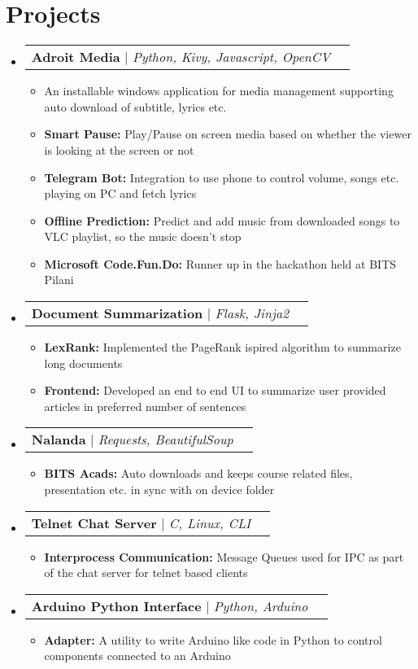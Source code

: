 \documentclass[letterpaper,11pt]{article}
\makeatletter
\newcommand{\resumeItem}[1]{
  \item\small{
    {#1 \vspace{-2pt}}
  }
}
\newcommand{\resumeProjectHeading}[2]{
    \item
    \begin{tabular*}{0.97\textwidth}{l@{\extracolsep{\fill}}r}
      \small#1 & #2 \\
    \end{tabular*}\vspace{-7pt}
}
\newcommand{\resumeSubHeadingListStart}{\begin{itemize}[leftmargin=0.15in, label={}]}
\newcommand{\resumeSubHeadingListEnd}{\end{itemize}}
\newcommand{\resumeItemListStart}{\begin{itemize}}
\newcommand{\resumeItemListEnd}{\end{itemize}\vspace{-5pt}}
\makeatother
\begin{document}
\section{Projects}
    \resumeSubHeadingListStart
      \resumeProjectHeading
          {\textbf{Adroit Media} $|$ \emph{Python, Kivy, Javascript, OpenCV}}{\href{https://adroitweb.github.io/}{\faGlobe} \href{https://github.com/triptu/AdroitMedia}{\faGithub}}
          \resumeItemListStart
            \resumeItem{An installable windows application for media management supporting auto download of subtitle, lyrics etc.}
            \resumeItem{\textbf{Smart Pause:} Play/Pause on screen media based on whether the viewer is looking at the screen or not}
            \resumeItem{\textbf{Telegram Bot:} Integration to use phone to control volume, songs etc. playing on PC and fetch lyrics}
            \resumeItem{\textbf{Offline Prediction:} Predict and add music from downloaded songs to VLC playlist, so the music doesn't stop}
            \resumeItem{\textbf{Microsoft Code.Fun.Do:} Runner up in the hackathon held at BITS Pilani}
          \resumeItemListEnd
      \resumeProjectHeading
          {\textbf{Document Summarization} $|$ \emph{Flask, Jinja2}}{}
          \resumeItemListStart
            \resumeItem{\textbf{LexRank:} Implemented the PageRank ispired algorithm to summarize long documents}
            \resumeItem{\textbf{Frontend:} Developed an end to end UI to summarize user provided articles in preferred number of sentences}
          \resumeItemListEnd
       \resumeProjectHeading
          {\textbf{Nalanda} $|$ \emph{Requests, BeautifulSoup}}{\href{https://github.com/triptu/Nalanda}{\faGithub}}
          \resumeItemListStart
            \resumeItem{\textbf{BITS Acads:} Auto downloads and keeps course related files, presentation etc. in sync with on device folder}
          \resumeItemListEnd
      \resumeProjectHeading
          {\textbf{Telnet Chat Server} $|$ \emph{C, Linux, CLI}}{\href{https://github.com/triptu/chat-server-np}{\faGithub}}
          \resumeItemListStart
            \resumeItem{\textbf{Interprocess Communication:} Message Queues used for IPC as part of the chat server for telnet based clients}
          \resumeItemListEnd
      \resumeProjectHeading
          {\textbf{Arduino Python Interface} $|$ \emph{Python, Arduino}}{\href{https://github.com/triptu/ardupy}{\faGithub}}
          \resumeItemListStart
            \resumeItem{\textbf{Adapter:} A utility to write Arduino like code in Python to control components connected to an Arduino}
          \resumeItemListEnd
    \resumeSubHeadingListEnd
\end{document}
